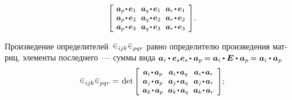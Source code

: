 \begin{otherlanguage}{russian}
\[\scalebox{0.92}[0.92]{$\left[\hspace{-0.2ex}\begin{array}{c@{\hspace{0.64em}}c@{\hspace{0.64em}}c}
\bm{a}_p \narrowdotp\hspace{0.12ex} \bm{e}_1 & \bm{a}_q \narrowdotp\hspace{0.12ex} \bm{e}_1 & \bm{a}_r \narrowdotp\hspace{0.12ex} \bm{e}_1 \\
\bm{a}_p \narrowdotp\hspace{0.12ex} \bm{e}_2 & \bm{a}_q \narrowdotp\hspace{0.12ex} \bm{e}_2 & \bm{a}_r \narrowdotp\hspace{0.12ex} \bm{e}_2 \\
\bm{a}_p \narrowdotp\hspace{0.12ex} \bm{e}_3 & \bm{a}_q \narrowdotp\hspace{0.12ex} \bm{e}_3 & \bm{a}_r \narrowdotp\hspace{0.12ex} \bm{e}_3
\end{array}\hspace{-0.12ex}\right]$} .
\]

\vspace{0.2em} \noindent Произведение определителей~${\levicivita_{ijk} \levicivita_{pqr}}$ равно определителю произведения матриц, элементы последнего~--- суммы вида ${\bm{a}_i \dotp \bm{e}_s \bm{e}_s \hspace{-0.2ex} \dotp \bm{a}_p \hspace{-0.12ex}= \bm{a}_i \dotp \bm{E} \dotp \bm{a}_p \hspace{-0.12ex}= \bm{a}_i \dotp \bm{a}_p}$ %
\[
\levicivita_{ijk} \levicivita_{pqr} = \hspace{0.25ex}
\operatorname{det}\hspace{-0.1ex}
\scalebox{0.92}[0.92]{$\left[\hspace{-0.16ex}\begin{array}{c@{\hspace{0.64em}}c@{\hspace{0.64em}}c}
\bm{a}_i \narrowdotp\hspace{0.12ex} \bm{a}_p & \bm{a}_i \narrowdotp\hspace{0.12ex} \bm{a}_q & \bm{a}_i \narrowdotp\hspace{0.12ex} \bm{a}_r \\
\bm{a}_j \narrowdotp\hspace{0.12ex} \bm{a}_p & \bm{a}_j \narrowdotp\hspace{0.12ex} \bm{a}_q & \bm{a}_j \narrowdotp\hspace{0.12ex} \bm{a}_r \\
\bm{a}_k \narrowdotp\hspace{0.12ex} \bm{a}_p & \bm{a}_k \narrowdotp\hspace{0.12ex} \bm{a}_q & \bm{a}_k \narrowdotp\hspace{0.12ex} \bm{a}_r
\end{array}\hspace{-0.12ex}\right]$} ;
\]


\end{otherlanguage}
